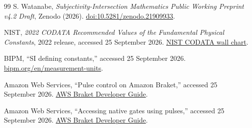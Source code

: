 \documentclass[11pt]{article}
\theoremstyle{definition}
\theoremstyle{remark}
\begin{document}
\begin{thebibliography}{99}
S. Watanabe, \emph{Subjectivity-Intersection Mathematics Public Working Preprint v4.2 Draft}, Zenodo (2026). \href{https://doi.org/10.5281/zenodo.21909933}{doi:10.5281/zenodo.21909933}.

NIST, \emph{2022 CODATA Recommended Values of the Fundamental Physical Constants}, 2022 release, accessed 25 September 2026. \href{https://www.physics.nist.gov/cuu/pdf/wall_2022.pdf}{NIST CODATA wall chart}.

BIPM, ``SI defining constants,'' accessed 25 September 2026. \href{https://www.bipm.org/en/measurement-units}{bipm.org/en/measurement-units}.

Amazon Web Services, ``Pulse control on Amazon Braket,'' accessed 25 September 2026. \href{https://docs.aws.amazon.com/braket/latest/developerguide/braket-pulse-control.html}{AWS Braket Developer Guide}.

Amazon Web Services, ``Accessing native gates using pulses,'' accessed 25 September 2026. \href{https://docs.aws.amazon.com/braket/latest/developerguide/braket-native-gate-pulse.html}{AWS Braket Developer Guide}.

\end{thebibliography}
\end{document}
